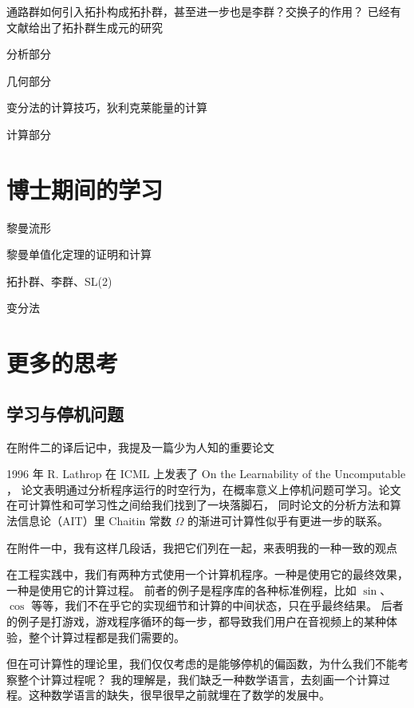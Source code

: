\documentclass[a4paper,12pt]{article}
\numberwithin{problem}{section}
\numberwithin{definition}{section}
\numberwithin{lemma}{section}
\numberwithin{proposition}{section}
\numberwithin{theorem}{section}
\numberwithin{grammar}{section}
\numberwithin{program}{section}
\numberwithin{convention}{section}
\numberwithin{corollary}{section}
\begin{document}
通路群如何引入拓扑构成拓扑群，甚至进一步也是李群？交换子的作用？
已经有文献给出了拓扑群生成元的研究

分析部分


几何部分

变分法的计算技巧，狄利克莱能量的计算

计算部分

\newpage

\section{博士期间的学习}

黎曼流形

黎曼单值化定理的证明和计算

拓扑群、李群、SL(2)

变分法

\newpage

\section{更多的思考}

\subsection{学习与停机问题}

在附件二的译后记中，我提及一篇少为人知的重要论文

\begin{displayquote}
1996 年 R. Lathrop 在 ICML 上发表了 On the Learnability of the Uncomputable ，
论文表明通过分析程序运行的时空行为，在概率意义上停机问题可学习。论文在可计算性和可学习性之间给我们找到了一块落脚石，
同时论文的分析方法和算法信息论（AIT）里 Chaitin 常数 $\Omega$ 的渐进可计算性似乎有更进一步的联系。
\end{displayquote}

在附件一中，我有这样几段话，我把它们列在一起，来表明我的一种一致的观点

\begin{displayquote}
在工程实践中，我们有两种方式使用一个计算机程序。一种是使用它的最终效果，一种是使用它的计算过程。
前者的例子是程序库的各种标准例程，比如 $\sin$、$\cos$ 等等，我们不在乎它的实现细节和计算的中间状态，只在乎最终结果。
后者的例子是打游戏，游戏程序循环的每一步，都导致我们用户在音视频上的某种体验，整个计算过程都是我们需要的。
\end{displayquote}

但在可计算性的理论里，我们仅仅考虑的是能够停机的偏函数，为什么我们不能考察整个计算过程呢？
我的理解是，我们缺乏一种数学语言，去刻画一个计算过程。这种数学语言的缺失，很早很早之前就埋在了数学的发展中。
\end{document}
